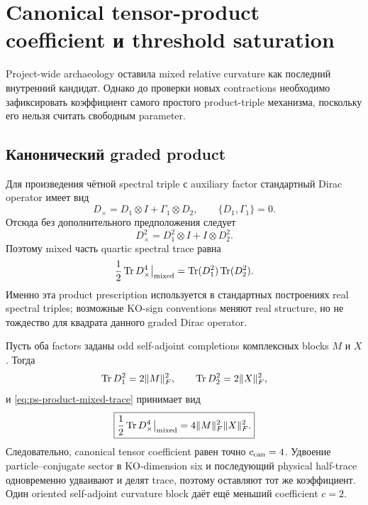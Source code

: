 \section{Canonical tensor-product coefficient и threshold saturation}

Project-wide archaeology оставила mixed relative curvature как последний
внутренний кандидат. Однако до проверки новых contractions необходимо
зафиксировать коэффициент самого простого product-triple механизма, поскольку
его нельзя считать свободным parameter.

\subsection{Канонический graded product}

Для произведения чётной spectral triple с auxiliary factor стандартный
Dirac operator имеет вид
\begin{equation}
 D_\times=D_1\otimes I+\Gamma_1\otimes D_2,
 \qquad \{D_1,\Gamma_1\}=0.
\end{equation}
Отсюда без дополнительного предположения следует
\begin{equation}
 D_\times^2=D_1^2\otimes I+I\otimes D_2^2.
\end{equation}
Поэтому mixed часть quartic spectral trace равна
\begin{equation}
 \frac12\operatorname{Tr} D_\times^4\big|_{\rm mixed}
 =\operatorname{Tr}(D_1^2)\operatorname{Tr}(D_2^2).
 \label{eq:ps-product-mixed-trace}
\end{equation}
Именно эта product prescription используется в стандартных построениях
real spectral triples; возможные KO-sign conventions меняют real structure,
но не тождество для квадрата данного graded Dirac operator.

Пусть оба factors заданы odd self-adjoint completions комплексных blocks
\(M\) и \(X\). Тогда
\begin{equation}
 \operatorname{Tr} D_1^2=2\|M\|_F^2,
 \qquad
 \operatorname{Tr} D_2^2=2\|X\|_F^2,
\end{equation}
и \eqref{eq:ps-product-mixed-trace} принимает вид
\begin{equation}
 \boxed{
 \frac12\operatorname{Tr} D_\times^4\big|_{\rm mixed}
 =4\|M\|_F^2\|X\|_F^2.}
 \label{eq:ps-canonical-tensor-c4}
\end{equation}
Следовательно, canonical tensor coefficient равен точно
\(c_{\rm can}=4\). Удвоение particle--conjugate sector в KO-dimension six
и последующий physical half-trace одновременно удваивают и делят trace,
поэтому оставляют тот же коэффициент. Один oriented self-adjoint curvature
block даёт ещё меньший coefficient \(c=2\).

